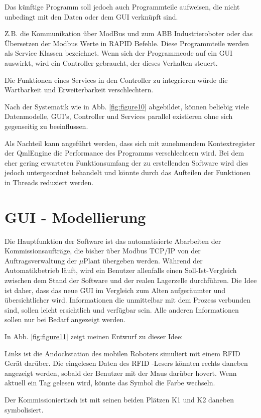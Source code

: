 Das künftige Programm soll jedoch auch Programmteile aufweisen, die nicht unbedingt mit den Daten oder dem GUI verknüpft sind.

Z.B. die Kommunikation über ModBus und zum ABB Industrieroboter oder das Übersetzen der Modbus Werte in
RAPID Befehle.
Diese Programmteile werden als Service Klassen bezeichnet.
Wenn sich der Programmcode auf ein GUI auswirkt, wird ein Controller gebraucht, der dieses Verhalten steuert.

Die Funktionen eines Services in den Controller zu integrieren würde die Wartbarkeit und Erweiterbarkeit verschlechtern.

Nach der Systematik wie in Abb. \ref{fig:figure10} abgebildet, können beliebig viele Datenmodelle, GUI's, Controller und Services
parallel existieren ohne sich gegenseitig zu beeinflussen.

Als Nachteil kann angeführt werden, dass sich mit zunehmendem Kontextregister der QmlEngine die Performance des Programms
verschlechtern wird.
Bei dem eher gering erwarteten Funktionsumfang der zu erstellenden Software wird dies jedoch untergeordnet behandelt und könnte
durch das Aufteilen der Funktionen in Threads reduziert werden.

\section{GUI - Modellierung}

Die Hauptfunktion der Software ist das automatisierte Abarbeiten der Kommissionsaufträge, die bisher über Modbus TCP/IP
von der Auftragsverwaltung der $\mu$Plant übergeben werden.
Während der Automatikbetrieb läuft, wird ein Benutzer allenfalls einen Soll-Ist-Vergleich zwischen dem Stand der 
Software und der realen Lagerzelle durchführen.
Die Idee ist daher, dass das neue GUI im Vergleich zum Alten aufgeräumter und übersichtlicher wird. 
Informationen die unmittelbar mit dem Prozess verbunden sind, sollen leicht ersichtlich und verfügbar sein. 
Alle anderen Informationen sollen nur bei Bedarf angezeigt werden.

In Abb. \ref{fig:figure11} zeigt meinen Entwurf zu dieser Idee:

Links ist die Andockstation des mobilen Roboters simuliert mit einem RFID Gerät darüber.
Die eingelesen Daten des RFID -Lesers könnten rechts daneben angezeigt werden, sobald der Benutzer mit der Maus 
darüber hovert. Wenn aktuell ein Tag gelesen wird, könnte das Symbol die Farbe wechseln.

Der Kommissioniertisch ist mit seinen beiden Plätzen \glqq K1\grqq{} und \glqq K2\grqq{}  daneben symbolisiert.

